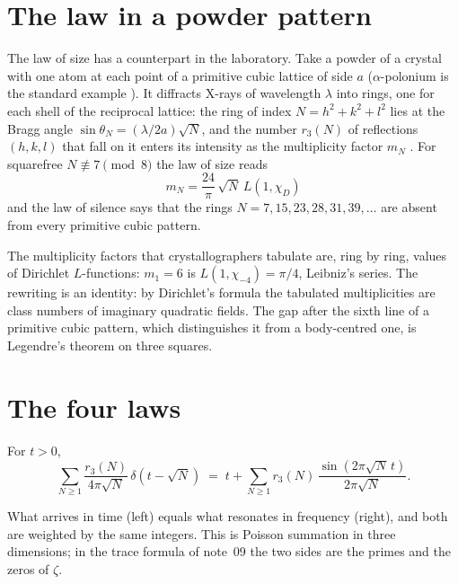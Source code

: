 \documentclass[11pt]{article}
\begin{document}
\section{The law in a powder pattern}

The law of size has a counterpart in the laboratory.
Take a powder of a crystal with one atom at each point of a primitive cubic lattice of side $a$ ($\alpha$-polonium is the standard example \cite{BeamerMaxwell}).
It diffracts X-rays of wavelength $\lambda$ into rings, one for each shell of the reciprocal lattice: the ring of index $N = h^2+k^2+l^2$ lies at the Bragg angle $\sin\theta_N = (\lambda/2a)\sqrt N$, and the number $r_3(N)$ of reflections $(h,k,l)$ that fall on it enters its intensity as the multiplicity factor $m_N$ \cite{Cullity}.
For squarefree $N\not\equiv 7\pmod 8$ the law of size reads
\[
  \boxed{\;m_N = \frac{24}{\pi}\,\sqrt N\,L(1,\chi_D)\;}
\]
and the law of silence says that the rings $N = 7, 15, 23, 28, 31, 39,\dots$ are absent from every primitive cubic pattern.

\physical
The multiplicity factors that crystallographers tabulate are, ring by ring, values of Dirichlet $L$-functions: $m_1 = 6$ is $L(1,\chi_{-4}) = \pi/4$, Leibniz's series.
The rewriting is an identity: by Dirichlet's formula the tabulated multiplicities are class numbers of imaginary quadratic fields.
The gap after the sixth line of a primitive cubic pattern, which distinguishes it from a body-centred one, is Legendre's theorem on three squares.

\section{The four laws}

\begin{derivation}\label{d:duality}
For $t>0$,
\[
  \sum_{N\ge1}\frac{r_3(N)}{4\pi\sqrt N}\,\delta(t-\sqrt N) \;=\; t+\sum_{N\ge1}r_3(N)\,\frac{\sin(2\pi\sqrt N\,t)}{2\pi\sqrt N}.
\]
\end{derivation}

\physical
What arrives in time (left) equals what resonates in frequency (right), and both are weighted by the same integers.
This is Poisson summation in three dimensions; in the trace formula of note~09 the two sides are the primes and the zeros of $\zeta$.
\end{document}

